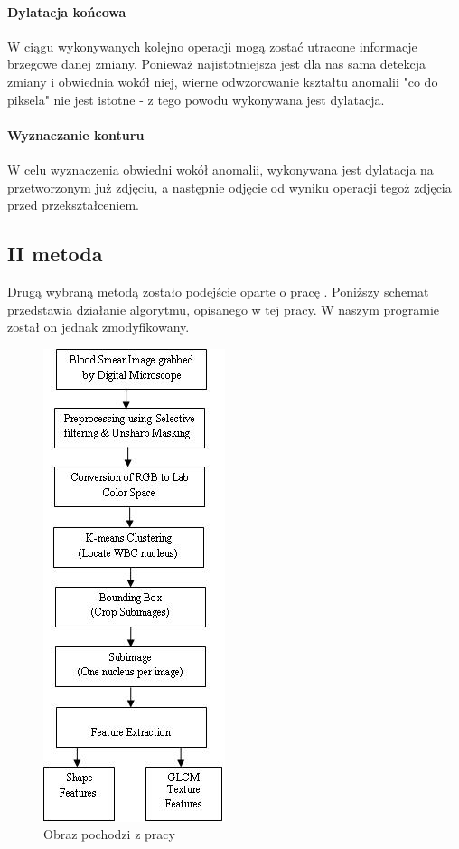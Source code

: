 \documentclass[11pt,openany]{sprawozdanie-agh}
\begin{document}
\paragraph{Dylatacja końcowa\\}
W ciągu wykonywanych kolejno operacji mogą zostać utracone informacje brzegowe danej zmiany. Ponieważ najistotniejsza jest dla nas sama detekcja zmiany i obwiednia wokół niej, wierne odwzorowanie kształtu anomalii "co do piksela" nie jest istotne - z tego powodu wykonywana jest dylatacja.

\paragraph{Wyznaczanie konturu\\}
W celu wyznaczenia obwiedni wokół anomalii, wykonywana jest dylatacja na przetworzonym już zdjęciu, a następnie odjęcie od wyniku operacji tegoż zdjęcia przed przekształceniem.

\subsection{II metoda}
Drugą wybraną metodą zostało podejście oparte o pracę \cite{Mohapatra:2011:ALD:1947940.1947980}. Poniższy schemat przedstawia działanie algorytmu, opisanego w tej pracy. W naszym programie został on jednak zmodyfikowany.

\begin{figure}[h!]
	\centering
		\includegraphics[scale=0.6]{schemat_Automated_Leukemia_Detection_in_Blood_Microscopic}
	\caption{Obraz pochodzi z pracy \cite{Mohapatra:2011:ALD:1947940.1947980}}
\end{figure}
\end{document}

